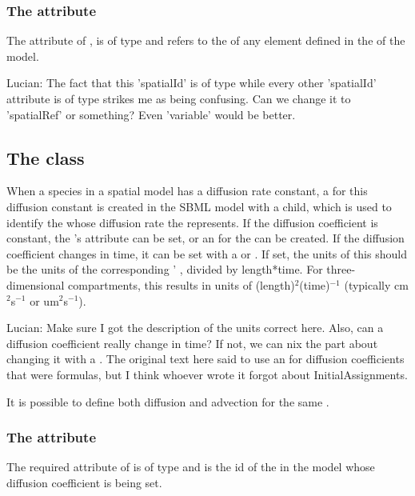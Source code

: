 \subsubsection{The  attribute}
The  attribute of \SpatialSymbolReference, is of type  and refers to the  of any element defined in the \Geometry of the model.

{\color{red} Lucian: \notice The fact that this 'spatialId' is of type  while every other 'spatialId' attribute is of type  strikes me as being confusing.  Can we change it to 'spatialRef' or something?  Even 'variable' would be better.}


\subsection{The  class}
\label{DiffusionCoefficient-class}
When a species in a spatial model has a diffusion rate constant, a \Parameter for this diffusion constant is created in the SBML model with a \DiffusionCoefficient child, which is used to identify the \Species whose diffusion rate the \Parameter represents. If the diffusion coefficient is constant, the \Parameter's  attribute can be set, or an \InitialAssignment for the \Parameter can be created.  If the diffusion coefficient changes in time, it can be set with a \Rule or \Event. If set, the units of this \Parameter should be the units of the corresponding \Species' , divided by length*time.  For three-dimensional compartments, this results in units of (length)$^2$(time)$^{-1}$ (typically cm$^2$s$^{-1}$ or um$^2$s$^{-1}$).

{\color{red} Lucian: \notice Make sure I got the description of the units correct here.  Also, can a diffusion coefficient really change in time?  If not, we can nix the part about changing it with a \Rule.  The original text here said to use an \AssignmentRule for diffusion coefficients that were formulas, but I think whoever wrote it forgot about InitialAssignments.}

It is possible to define both diffusion and advection for the same \Species.

\subsubsection{The  attribute}
The required  attribute of \DiffusionCoefficient is of type  and is the id of the \Species in the model whose diffusion coefficient is being set.

